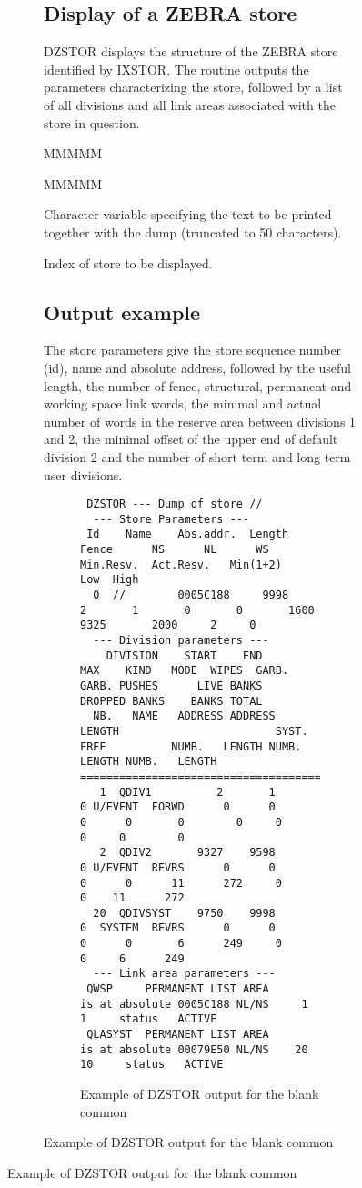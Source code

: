\begin{figure}
\begin{figure}
\subsection{Display of a ZEBRA store}
\par DZSTOR displays the structure of the ZEBRA store identified by IXSTOR.
The routine outputs the parameters
characterizing the store, followed by a
list of all divisions and all link areas associated with the store in
question.
\begin{DL}{MMMMM}
\item[Input:
]
\begin{DL}{MMMMM}
\item[CHTEXT
]Character variable specifying the text to be printed
together with the dump (truncated to 50 characters).
\item[IXSTOR
]Index of store to be displayed.
\end{DL}
\end{DL}
\subsection{Output example}
\par The store parameters give the store sequence number (id), name and
absolute address, followed by the useful length, the number of fence,
structural, permanent and working space link words, the minimal and
actual number of words in the reserve area between divisions 1 and 2,
the minimal offset of the upper end of default division 2 and the
number of short term and long term user divisions.
\begin{figure}
\caption{Example of DZSTOR output for the blank common}
\begin{verbatim}
 DZSTOR --- Dump of store //
  --- Store Parameters ---
 Id    Name    Abs.addr.  Length   Fence      NS      NL      WS  Min.Resv.  Act.Resv.   Min(1+2)   Low  High
  0  //        0005C188     9998       2       1       0       0       1600       9325       2000     2     0
  --- Division parameters ---
    DIVISION    START    END       MAX    KIND   MODE  WIPES  GARB.  GARB. PUSHES      LIVE BANKS  DROPPED BANKS    BANKS TOTAL
  NB.   NAME   ADDRESS ADDRESS  LENGTH                        SYST.   FREE          NUMB.   LENGTH NUMB.   LENGTH NUMB.   LENGTH
==================================================================================================================================
   1  QDIV1          2       1       0 U/EVENT  FORWD      0      0      0      0       0        0     0        0     0        0
   2  QDIV2       9327    9598       0 U/EVENT  REVRS      0      0      0      0      11      272     0        0    11      272
  20  QDIVSYST    9750    9998       0  SYSTEM  REVRS      0      0      0      0       6      249     0        0     6      249
  --- Link area parameters ---
 QWSP     PERMANENT LIST AREA      is at absolute 0005C188 NL/NS     1    1     status   ACTIVE
 QLASYST  PERMANENT LIST AREA      is at absolute 00079E50 NL/NS    20   10     status   ACTIVE
\end{verbatim}
\end{figure}

\end{figure}
\end{figure}
